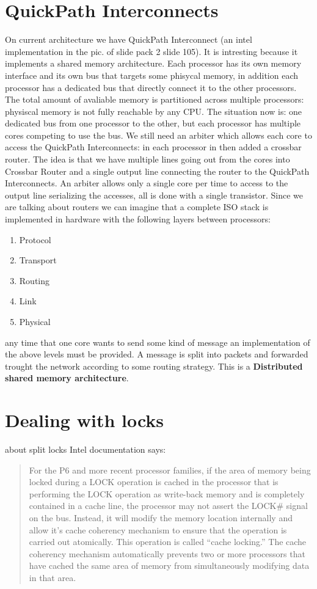 \documentclass[a4paper,12pt]{article}
\begin{document}
\section{ QuickPath Interconnects}
On current architecture we have QuickPath Interconnect (an intel implementation in the pic. of slide pack 2 slide 105). It is intresting because it implements a shared memory architecture. Each processor has its own memory interface and its own bus that targets some phisycal memory, in addition each processor has a dedicated bus that directly connect it to the other processors. The total amount of avaliable memory is partitioned across multiple processors: physiscal memory is not fully reachable by any CPU. 
The situation now is: one dedicated bus from one processor to the other, but each processor has multiple cores competing to use the bus. We still need an arbiter which allows  each core to access the QuickPath Interconnects: in each processor in then added a crossbar router. The idea is that we have multiple lines going out from the cores into Crossbar Router and a single output line connecting the router to the QuickPath Interconnects. An arbiter allows only a single core per time to access to the output line serializing the accesses, all is done with a single transistor. Since we are talking about routers we can imagine that a complete ISO stack is implemented in hardware with the following layers between processors:
\begin{enumerate}
\item Protocol
\item Transport
\item Routing
\item Link
\item Physical
\end{enumerate}
any time that one core wants to send some kind of message an implementation of the above levels must be provided. A message is split into packets and forwarded trought the network according to some routing strategy. This is a \textbf{Distributed shared memory architecture}. 
\section{Dealing with locks}
about split locks Intel documentation says:\begin{quote}For the P6 and more recent processor families, if the area of memory
being locked during a LOCK operation is cached in the processor that is
performing the LOCK operation as write-back memory and is completely
contained in a cache line, the processor may not assert the LOCK\# signal
on the bus. Instead, it will modify the memory location internally and
allow it’s cache coherency mechanism to ensure that the operation is
carried out atomically. This operation is called “cache locking.” The cache
coherency mechanism automatically prevents two or more processors
that have cached the same area of memory from simultaneously
modifying data in that area.\end{quote}
\end{document}
